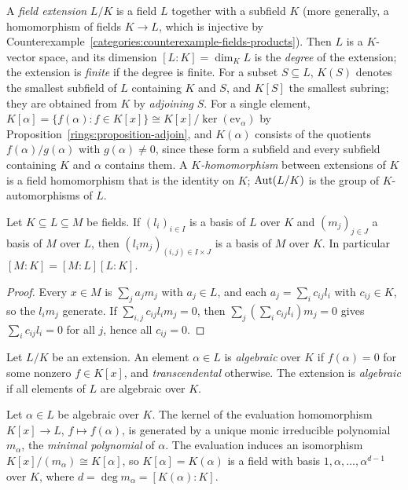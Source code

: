 \begin{definition}\label{fields:definition-extension}
A \emph{field extension} $L/K$ is a field $L$ together with a subfield $K$ (more
generally, a homomorphism of fields $K \to L$, which is injective by
Counterexample~\ref{categories:counterexample-fields-products}). Then $L$ is a
$K$-vector space, and its dimension $[L : K] = \dim_K L$ is the \emph{degree} of the
extension; the extension is \emph{finite} if the degree is finite. For a subset
$S \subseteq L$, $K(S)$ denotes the smallest subfield of $L$ containing $K$ and $S$, and $K[S]$
the smallest subring; they are obtained from $K$ by \emph{adjoining} $S$. For a single element,
$K[\alpha] = \{f(\alpha) : f \in K[x]\} \cong K[x]/\ker(\mathrm{ev}_\alpha)$ by
Proposition~\ref{rings:proposition-adjoin}, and $K(\alpha)$ consists of the quotients $f(\alpha)/g(\alpha)$ with
$g(\alpha) \neq 0$, since these form a subfield and every subfield containing $K$ and $\alpha$ contains
them. A \emph{$K$-homomorphism} between extensions of $K$ is a field
homomorphism that is the identity on $K$; $\operatorname{Aut}(L/K)$ is the group of $K$-automorphisms
of $L$.
\end{definition}

\begin{theorem}\label{fields:theorem-tower}
Let $K \subseteq L \subseteq M$ be fields. If $(l_i)_{i \in I}$ is a basis of $L$ over $K$ and $(m_j)_{j \in J}$ a
basis of $M$ over $L$, then $(l_i m_j)_{(i,j) \in I \times J}$ is a basis of $M$ over $K$. In
particular $[M : K] = [M : L][L : K]$.
\end{theorem}

\begin{proof}
Every $x \in M$ is $\sum_j a_j m_j$ with $a_j \in L$, and each $a_j = \sum_i c_{ij} l_i$ with
$c_{ij} \in K$, so the $l_i m_j$ generate. If $\sum_{i,j} c_{ij} l_i m_j = 0$, then
$\sum_j (\sum_i c_{ij} l_i) m_j = 0$ gives $\sum_i c_{ij} l_i = 0$ for all $j$, hence all $c_{ij} = 0$.
\end{proof}

\begin{definition}\label{fields:definition-algebraic}
Let $L/K$ be an extension. An element $\alpha \in L$ is \emph{algebraic} over $K$ if
$f(\alpha) = 0$ for some nonzero $f \in K[x]$, and \emph{transcendental} otherwise. The
extension is \emph{algebraic} if all elements of $L$ are algebraic over $K$.
\end{definition}

\begin{proposition}\label{fields:proposition-minimal-polynomial}
Let $\alpha \in L$ be algebraic over $K$. The kernel of the evaluation homomorphism
$K[x] \to L$, $f \mapsto f(\alpha)$, is generated by a unique monic irreducible polynomial
$m_\alpha$, the \emph{minimal polynomial} of $\alpha$. The evaluation induces an isomorphism
$K[x]/(m_\alpha) \cong K[\alpha]$, so $K[\alpha] = K(\alpha)$ is a field with basis
$1, \alpha, \ldots, \alpha^{d-1}$ over $K$, where $d = \deg m_\alpha = [K(\alpha) : K]$.
\end{proposition}

